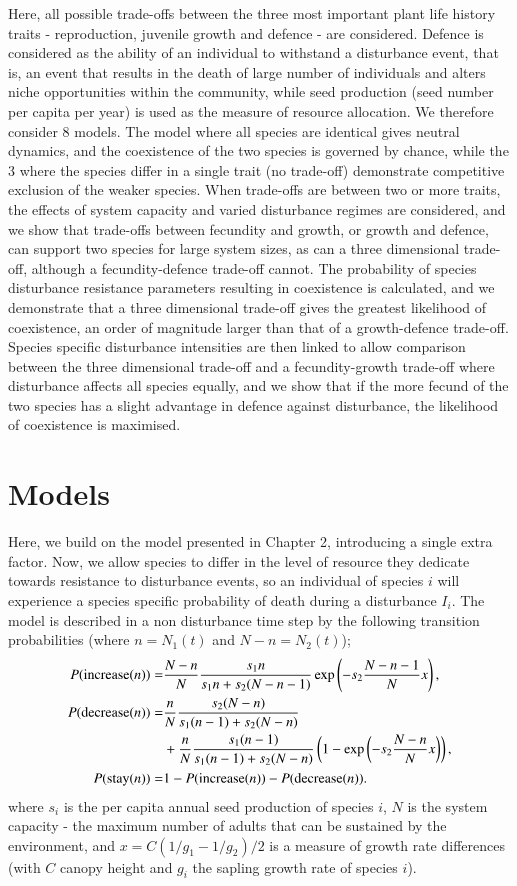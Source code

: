 Here, all possible trade-offs between the three most important plant life history traits - reproduction, juvenile growth and defence - are considered. Defence is considered as the ability of an individual to withstand a disturbance event, that is, an event that results in the death of large number of individuals and alters niche opportunities within the community, while seed production (seed number per capita per year) is used as the measure of resource allocation. We therefore consider 8 models. The model where all species are identical gives neutral dynamics, and the coexistence of the two species is governed by chance, while the 3 where the species differ in a single trait (no trade-off) demonstrate competitive exclusion of the weaker species. When trade-offs are between two or more traits, the effects of system capacity and varied disturbance regimes  are considered, and we show that trade-offs between fecundity and growth, or growth and defence, can support two species for large system sizes, as can a three dimensional trade-off, although a fecundity-defence trade-off cannot. The probability of species disturbance resistance parameters resulting in coexistence is calculated, and we demonstrate that a three dimensional trade-off gives the greatest likelihood of coexistence, an order of magnitude larger than that of a growth-defence trade-off. Species specific disturbance intensities are then linked to allow comparison between the three dimensional trade-off and a fecundity-growth trade-off where disturbance affects all species equally, and we show that if the more fecund of the two species has a slight advantage in defence against disturbance, the likelihood of coexistence is maximised.


\section{Models}
Here, we build on the model presented in Chapter 2, introducing a single extra factor. Now, we allow species to differ in the level of resource they dedicate towards resistance to disturbance events, so an individual of species $i$ will experience a species specific probability of death during a disturbance $I_i$. The model is described in a non disturbance time  step by the following transition probabilities (where $n=N_1(t)$ and $N-n=N_2(t)$);
\begin{align}
\label{inc}P(\text{increase}(n))=&\frac{N-n}{N}\frac{s_1 n}{s_1 n +s_2(N-n-1)}\exp \left( -s_2 \frac{N-n-1}{N} x\right),\\
\label{dec}P(\text{decrease}(n))=&\frac{n}{N}\frac{s_2 (N-n)}{s_1 (n-1) +s_2(N-n)}  \\
& + \frac{n}{N}\frac{s_1 (n-1)}{s_1 (n-1) +s_2(N-n)}\left(1-\exp \left( -s_2 \frac{N-n}{N} x\right)\right), \notag \\
\label{stay}P(\text{stay}(n))=&1-P(\text{increase}(n))-P(\text{decrease}(n)).
\end{align}
where $s_i$ is the per capita annual seed production of species $i$, $N$ is the system capacity - the maximum number of adults that can be sustained by the environment, and $x=C(1/g_1 - 1/g_2)/2$ is a measure of growth rate differences (with $C$ canopy height and $g_i$ the sapling growth rate of species $i$).

